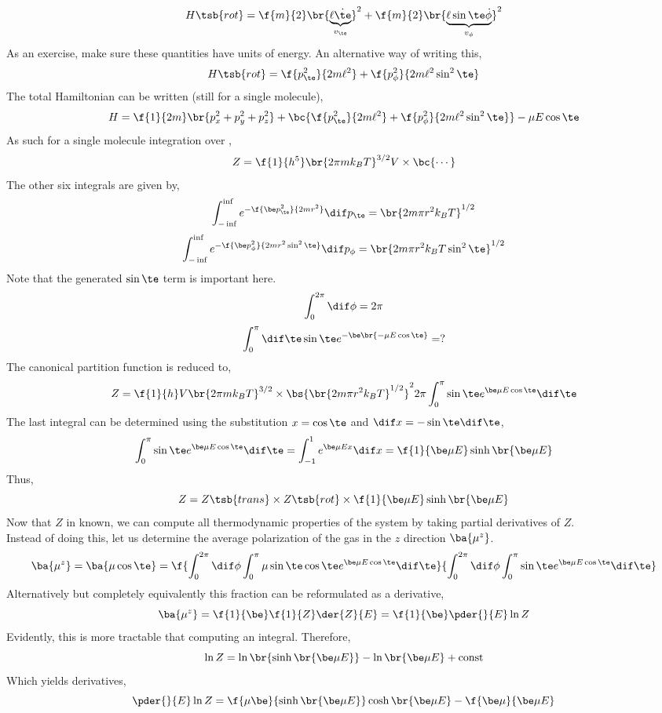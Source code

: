 \documentclass{article}
\begin{document}
\[ H\tsb{rot} = \f{m}{2}\br{\underbrace{\ell \dot{\te}}_{v_\te}}^2 + \f{m}{2} \br{\underbrace{\ell \sin \te \dot{\phi}}_{v_\phi}}^2 \]
As an exercise, make sure these quantities have units of energy. An alternative way of writing this,
\[ H\tsb{rot} = \f{p_\te^2}{2m \ell^2} + \f{p_\phi^2}{2m \ell^2 \sin^2 \te} \]
The total Hamiltonian can be written (still for a single molecule),
\[ H = \f{1}{2m}\br{p_x^2 + p_y^2 + p_z^2} + \bc{\f{p_\te^2}{2m \ell^2} + \f{p_\phi^2}{2m \ell^2 \sin^2 \te}} - \mu E \cos \te \]
As such for a single molecule integration over $ $,
\[ Z = \f{1}{h^5}\br{2\pi m k_B T}^{3/2} V \times \bc{\cdots} \]
The other six integrals are given by,
\[ \int_{-\inf}^{\inf} e^{-\f{\be p_\te^2}{2mr^2}} \dif p_\te = \br{2m\pi r^2 k_B T}^{1/2} \]
\[ \int_{-\inf}^{\inf} e^{-\f{\be p_\phi^2}{2mr^2\sin^2 \te}}  \dif p_\phi = \br{2m\pi r^2 k_B T \sin^2 \te}^{1/2} \]
Note that the generated $\sin \te$ term is important here.
\[ \int_{0}^{2\pi} \dif \phi = 2\pi \]
\[ \int_{0}^{\pi} \dif \te \sin \te e^{-\be\br{-\mu E \cos \te}} = ? \]
The canonical partition function is reduced to,
\[ Z = \f{1}{h} V \br{2\pi m k_B T}^{3/2} \times \bs{\br{2m \pi r^2 k_B T}^{1/2}}^2 2 \pi \int_{0}^{\pi} \sin \te e^{\be \mu E \cos \te} \dif \te \]
The last integral can be determined using the substitution $x = \cos \te$ and $\dif x = - \sin \te \dif \te$,
\[ \int_{0}^{\pi} \sin \te e^{\be \mu E \cos \te} \dif \te = \int_{-1}^{1} e^{\be \mu E x} \dif x = \f{1}{\be \mu E} \sinh \br{\be \mu E} \]
Thus,
\[ Z = Z\tsb{trans} \times Z\tsb{rot} \times  \f{1}{\be \mu E} \sinh \br{\be \mu E} \]
Now that $Z$ in known, we can compute all thermodynamic properties of the system by taking partial derivatives of $Z$.\\

Instead of doing this, let us determine the average polarization of the gas in the $z$ direction $\ba{\mu^z}$.
\[ \ba{\mu^z} = \ba{\mu \cos \te} = \f{\int_{0}^{2\pi} \dif \phi \int_{0}^{\pi} \mu\sin \te  \cos \te e^{\be \mu E \cos \te} \dif \te}{\int_{0}^{2\pi} \dif \phi \int_{0}^{\pi} \sin \te e^{\be \mu E \cos \te}
\dif \te} \]
Alternatively but completely equivalently this fraction can be reformulated as a derivative,
\[ \ba{\mu^z} = \f{1}{\be}\f{1}{Z} \der{Z}{E} = \f{1}{\be}\pder{}{E} \ln Z  \]
Evidently, this is more tractable that computing an integral. Therefore,
\[ \ln Z = \ln \br{\sinh \br{\be \mu E}} - \ln \br{\be \mu E} + \text{const} \]
Which yields derivatives,
\[ \pder{}{E}\ln Z = \f{\mu \be}{\sinh\br{\be \mu E}}\cosh\br{\be \mu E} - \f{\be \mu}{\be \mu E} \]
\end{document}
